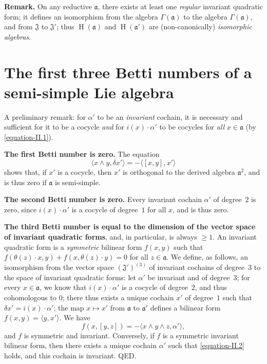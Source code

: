 \documentclass{article}
\newcommand{\fk}{\mathfrak}
\renewcommand{\geq}{\geqslant}
\DeclareMathOperator{\HH}{H}
\newcommand{\oldpage}[1]{\marginpar{\footnotesize$\Big\vert$ \textit{p.~#1}}}
\begin{document}
\medskip
\textbf{Remark.}
On any reductive $\fk{a}$, there exists at least one \emph{regular} invariant quadratic form;
it defines an isomorphism from the algebra $\Gamma(\fk{a})$ to the algebra $\Gamma(\fk{a})$, and from $\fk{J}$ to $\fk{J}'$;
thus $\HH(\fk{a})$ and $\HH(\fk{a}')$ are (non-canonically) \emph{isomorphic algebras}.


\section{The first three Betti numbers of a semi-simple Lie algebra}
\label{II.5}

A preliminary remark:
for $\alpha'$ to be an \emph{invariant} cochain, it is necessary and sufficient for it to be a cocycle \emph{and} for $i(x)\cdot\alpha'$ to be cocycles for \emph{all} $x\in\fk{a}$ (by \cref{equation-II.1}).

\medskip
\textbf{The first Betti number is zero.}
The equation
\[
  \langle x\wedge y,\delta x'\rangle
  = -\langle[x,y],x'\rangle
\]
shows that, if $x'$ is a cocycle, then $x'$ is orthogonal to the derived algebra $\fk{a}^2$, and is thus zero if $\fk{a}$ is semi-simple.

\medskip
\textbf{The second Betti number is zero.}
Every invariant cochain $\alpha'$ of degree~$2$ is zero, since $i(x)\cdot\alpha'$ is a cocycle of degree~$1$ for all $x$, and is thus zero.

\medskip
\textbf{The third Betti number is equal to the dimension of the vector space of invariant quadratic forms}, and, in particular, is always $\geq1$.
An invariant quadratic form is a \emph{symmetric} bilinear form $f(x,y)$ such that $f(\theta(z)\cdot x,y)+f(x,\theta(z)\cdot y)=0$ for all $z\in\fk{a}$.
We define, as follows, an isomorphism from the vector space $(\fk{J}')^{(3)}$ of invariant cochains of degree~$3$ to the space of invariant quadratic forms:
let $\alpha'$ be invariant and of degree~$3$;
for every $x\in\fk{a}$, we know that $i(x)\cdot\alpha'$ is a cocycle of degree~$2$, and thus cohomologous to $0$;
there thus exists a unique cochain $x'$ of degree~$1$ such that $\delta x'=i(x)\cdot\alpha'$;
the map $x\mapsto x'$ from $\fk{a}$ to $\fk{a}'$ defines a
\oldpage{49}
bilinear form $f(x,y)=\langle y,x'\rangle$.
We have
\[
\label{equation-II.2}
  f(x,[y,z])
  = -\langle x\wedge y\wedge z,\alpha'\rangle,
\tag{2}
\]
and $f$ is symmetric and invariant.
Conversely, if $f$ is a symmetric invariant bilinear form, then there exists a unique cochain $\alpha'$ such that \cref{equation-II.2} holds, and this cochain is invariant.
QED.
\end{document}
